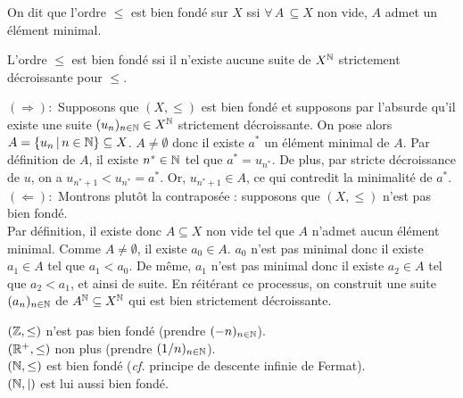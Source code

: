 			\begin{Definition}
				On dit que l'ordre \(\leqslant\) est bien fondé sur \(X\) ssi \(\forall\,A \, \subseteq X\) non vide, \(A\) admet un élément minimal.
			\end{Definition}
			
			\begin{Propriete}
				L'ordre \(\leqslant\) est bien fondé ssi il n'existe aucune suite de \(X^{\mathbb{N}}\) strictement décroissante pour \(\leqslant\).
			\end{Propriete}
			
			\begin{Preuve}
				\(\bm{(\Rightarrow) :}\) Supposons que \((X,\leqslant)\) est bien fondé et supposons par l'absurde qu'il existe une suite \((u_n)_{n\in\mathbb{N}} \in X^{\mathbb{N}}\) strictement décroissante. On pose alors \(A = \{u_n \,|\, n\in\mathbb{N}\} \subseteq X\). \nt
				\(A \neq \emptyset\) donc il existe \(a^*\) un élément minimal de \(A\). Par définition de \(A\), il existe \(n^* \in \mathbb{N}\) tel que \(a^* = u_{n^*}\). De plus, par stricte décroissance de \(u\), on a \(u_{n^*+1} < u_{n^*} = a^*\). \nt
				Or, \(u_{n^*+1} \in A\), ce qui contredit la minimalité de \(a^*\). \\[3mm]
				\(\bm{(\Leftarrow) :}\) Montrons plutôt la contraposée : supposons que \((X,\leqslant)\) n'est pas bien fondé. \\
				Par définition, il existe donc \(A \subseteq X\) non vide tel que \(A\) n'admet aucun élément minimal. \nt
				Comme \(A \neq \emptyset\), il existe \(a_0 \in A\). \(a_0\) n'est pas minimal donc il existe \(a_1 \in A\) tel que \(a_1 < a_0\).
				De même, \(a_1\) n'est pas minimal donc il existe \(a_2 \in A\) tel que \(a_2 < a_1\), et ainsi de suite. \nt
				En réitérant ce processus, on construit une suite \((a_n)_{n\in\mathbb{N}}\) de \(A^{\mathbb{N}} \subseteq X^{\mathbb{N}}\) qui est bien strictement décroissante.
			\end{Preuve}
			
			\begin{Exemples} \bdot \((\mathbb{Z},\leq)\) n'est pas bien fondé (prendre \((-n)_{n\in\mathbb{N}}\)). \\
				\hspace*{23mm} \bdot \((\mathbb{R}^+,\leq)\) non plus (prendre \((1/n)_{n\in\mathbb{N}}\)). \\
				\hspace*{23mm} \bdot \((\mathbb{N},\leq)\) est bien fondé (\emph{cf.} principe de descente infinie de Fermat). \\
				\hspace*{23mm} \bdot \((\mathbb{N},|)\) est lui aussi bien fondé.
			\end{Exemples}
			

